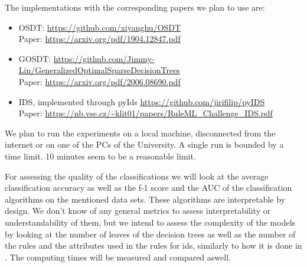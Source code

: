 \documentclass[preprint,a4paper]{sig-alternate-xt}
\begin{document}
The implementations with the corresponding papers we plan to use are:\\
\begin{itemize}
\item OSDT: \url{https://github.com/xiyanghu/OSDT} \\
Paper: \url{https://arxiv.org/pdf/1904.12847.pdf}
\item GOSDT: \url{https://github.com/Jimmy-Lin/GeneralizedOptimalSparseDecisionTrees}\\
Paper: \url{https://arxiv.org/pdf/2006.08690.pdf}
\item IDS, implemented through pyIds \url{https://github.com/jirifilip/pyIDS}\\
Paper: \url{https://nb.vse.cz/~klit01/papers/RuleML_Challenge_IDS.pdf}
\end{itemize}

We plan to run the experiments on a local machine, disconnected from the internet or on one of the PCs of the University. A single run is bounded by a time limit. 10 minutes seem to be a reasonable limit.  

For assessing the quality of the classifications we will look at the average classification accuracy as well as the f-1 score and the AUC of the classification algorithms on the mentioned data sets. These algorithms are interpretable by design. We don't know of any general metrics to assess interpretability or understandability of them, but we intend to assess the complexity of the models by looking at the number of leaves of the decision trees as well as the number of the rules and the attributes used in the rules for ids, similarly to how it is done in \cite{atzm1}. The computing times will be measured and compared aswell.







\end{document}
